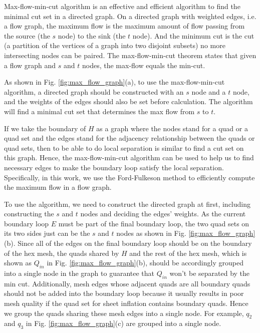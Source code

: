 \documentclass[final,5p,times,twocolumn]{elsarticle}
\begin{document}
Max-flow-min-cut algorithm is an effective and efficient algorithm to find the minimal cut set in a directed graph\cite{lawler20014}. On a directed graph with weighted edges, i.e. a flow graph, the maximum flow is the maximum amount of flow passing from the source (the $s$ node) to the sink (the $t$ node). And the minimum cut is the cut (a partition of the vertices of a graph into two disjoint subsets) no more intersecting nodes can be paired. The max-flow-min-cut theorem states that given a flow graph and $s$ and $t$ nodes, the max-flow equals the min-cut.

As shown in Fig. \ref{fig:max_flow_graph}(a), to use the max-flow-min-cut algorithm, a directed graph should be constructed with an $s$ node and a $t$ node, and the weights of the edges should also be set before calculation. The algorithm will find a minimal cut set that determines the max flow from $s$ to $t$.

If we take the boundary of $H$ as a graph where the nodes stand for a quad or a quad set and the edges stand for the adjacency relationship between the quads or quad sets, then to be able to do local separation is similar to find a cut set on this graph. Hence, the max-flow-min-cut algorithm can be used to help us to find necessary edges to make the boundary loop satisfy the local separation. Specifically, in this work, we use the Ford-Fulkeson\cite{ford1956maximal} method to efficiently compute the maximum flow in a flow graph.

To use the algorithm, we need to construct the directed graph at first, including constructing the $s$ and $t$ nodes and deciding the edges' weights. As the current boundary loop $E$ must be part of the final boundary loop, the two quad sets on its two sides just can be the $s$ and $t$ nodes as shown in Fig. \ref{fig:max_flow_graph}(b). Since all of the edges on the final boundary loop should be on the boundary of the hex mesh, the quads shared by $H$ and the rest of the hex mesh, which is shown as $Q_{in}$ in Fig. \ref{fig:max_flow_graph}(b), should be accordingly grouped into a single node in the graph to guarantee that $Q_{in}$ won't be separated by the min cut. Additionally, mesh edges whose adjacent quads are all boundary quads should not be added into the boundary loop because it usually results in poor mesh quality if the quad set for sheet inflation contains boundary quads. Hence we group the quads sharing these mesh edges into a single node. For example, $q_2$ and $q_3$ in Fig. \ref{fig:max_flow_graph}(c) are grouped into a single node.
\end{document}
